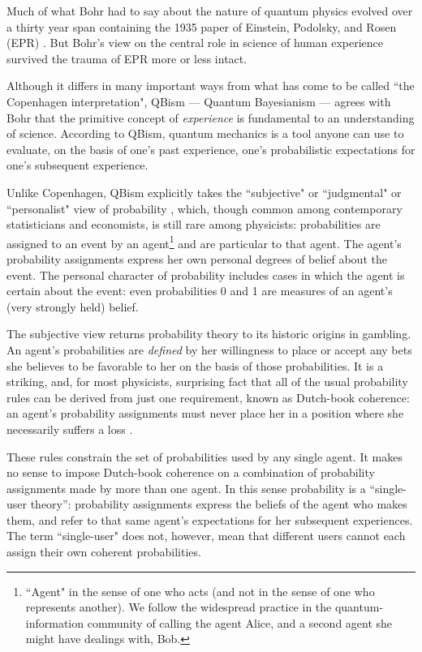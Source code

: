 \documentclass[aps,prb,superscriptaddress,12pt,tightenlines,nofootinbib]{revtex4-2}
\begin{document}

Much of what Bohr had to say about the nature of quantum physics evolved over a
thirty year span containing the 1935 paper of Einstein, Podolsky, and Rosen
(EPR) \cite{Einstein35}.   But Bohr's view on the central role in science of human experience
survived the trauma of EPR more or less intact.

Although it differs in many important ways from what has come to be called ``the Copenhagen interpretation", QBism\cite{Fuchs10} --- Quantum Bayesianism  ---  agrees with Bohr
that the primitive concept of  {\it experience} is fundamental to an understanding of science.   According to
QBism, quantum mechanics is a tool anyone can use to evaluate, on the basis of one's past experience, one's probabilistic expectations for one's subsequent  experience.

Unlike Copenhagen, QBism explicitly takes the ``subjective" or  ``judgmental"
or ``personalist" view of probability \cite{Savage54,deFinetti90,Bernardo94,Jeffrey04,Lindley06},
which, though common among contemporary  statisticians and eco\-nom\-ists, is still rare among physicists:  probabilities are assigned to an event by an agent\footnote{``Agent" in the sense of one who acts (and not in the sense of one who represents another).  We follow the widespread practice in the quantum-information community of calling the agent Alice, and a second agent she might have dealings with, Bob.} and are particular to that agent.   The agent's probability assignments express her own personal degrees of belief about the event.    The personal character of probability  includes cases in which the agent is certain about the event:  even probabilities 0 and 1 are measures of an agent's (very strongly held) belief.

The subjective view returns probability theory to its historic origins in gambling.   An agent's probabilities are {\it defined} by her  willingness to
place or accept any bets she believes to be favorable to her on the basis of those probabilities.
It is a striking, and, for most physicists, surprising fact that all of the
usual probability rules can be derived from just one requirement, known as
Dutch-book coherence: an agent's probability assignments must never place her
in a position where she necessarily suffers a loss \cite{deFinetti90,Fuchs13}.

These rules constrain the set of probabilities used by any single agent.   It makes no sense to impose Dutch-book coherence on a combination of probability assignments made by more than one agent.   In this  sense probability is a ``single-user theory'':     probability assignments express the beliefs of the agent who makes them, and refer to that same agent's expectations for her subsequent experiences.   The term ``single-user" does not, however,  mean that  different users cannot each assign their own coherent probabilities.
\end{document}
